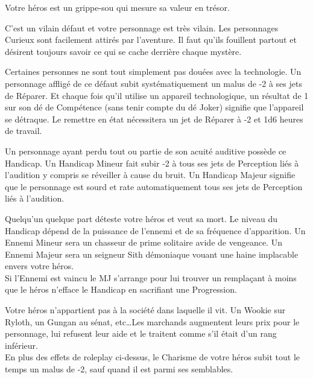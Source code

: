 \begin{description}[align=left]
    \item [Cupide (Mineur)]
        Votre héros est un grippe-sou qui mesure sa valeur en trésor.

    \item [Curieux (Majeur)]
        C’est un vilain défaut et votre personnage est très vilain. Les personnages Curieux sont facilement attirés par l’aventure. Il faut qu’ils fouillent partout et désirent toujours savoir ce qui se cache derrière chaque mystère.

    \item [Deux mains gauches (Mineur)]
        Certaines personnes ne sont tout simplement pas douées avec la technologie. Un personnage affligé de ce défaut subit systématiquement un malus de -2 à ses jets de Réparer. Et chaque fois qu’il utilise un appareil technologique, un résultat de 1 sur son dé de Compétence (sans tenir compte du dé Joker) signifie que l’appareil se détraque. Le remettre en état nécessitera un jet de Réparer à -2 et 1d6 heures de travail.

    \item [Dur d’Oreille (Mineur ou Majeur)]
        Un personnage ayant perdu tout ou partie de son acuité auditive possède ce Handicap. Un Handicap Mineur fait subir -2 à tous ses jets de Perception liés à l’audition y compris se réveiller à cause du bruit. Un Handicap Majeur signifie que le personnage est sourd et rate automatiquement tous ses jets de Perception liés à l’audition.

    \item [Ennemi (Mineur ou Majeur)]
        Quelqu’un quelque part déteste votre héros et veut sa mort. Le niveau du Handicap dépend de la puissance de l’ennemi et de sa fréquence d’apparition. Un Ennemi Mineur sera un chasseur de prime solitaire avide de vengeance. Un Ennemi Majeur sera un seigneur Sith démoniaque vouant une haine implacable envers votre héros.\\
        Si l’Ennemi est vaincu le MJ s’arrange pour lui trouver un remplaçant à moins que le héros n’efface le Handicap en sacrifiant une Progression.

    \item [Étranger (Mineur)]
        Votre héros n’appartient pas à la société dans laquelle il vit. Un Wookie sur Ryloth, un Gungan au sénat, etc\ldots Les marchands augmentent leurs prix pour le personnage, lui refusent leur aide et le traitent comme s’il était d’un rang inférieur. \\
        En plus des effets de roleplay ci-dessus, le Charisme de votre héros subit tout le temps un malus de -2, sauf quand il est parmi ses semblables.


\end{description}
